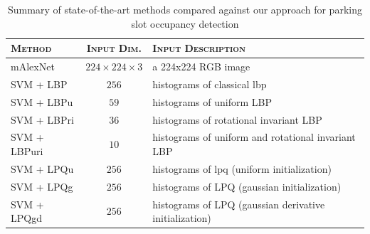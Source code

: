 \begin{table}
    \begin{tabularx}{\linewidth}{lcX}
        \toprule
        \textsc{Method} & \textsc{Input Dim.}     & \textsc{Input Description} \\
        \midrule
        mAlexNet         & $224\times 224\times 3$ & a 224x224 RGB image \\
        SVM + LBP        & $256$                     & histograms of classical \acrfull{lbp} \cite{ojala2002multiresolution} \\
        SVM + LBPu       & $59$                      & histograms of uniform LBP \cite{ojala2002multiresolution} \\
        SVM + LBPri      & $36$                      & histograms of rotational invariant LBP \cite{ojala2002multiresolution}  \\
        SVM + LBPuri     & $10$                      & histograms of uniform and rotational invariant LBP \cite{ojala2002multiresolution} \\
        SVM + LPQu       & $256$                     & histograms of \acrfull{lpq} (uniform initialization) \cite{ojansivu2008blur} \\
        SVM + LPQg       & $256$                     & histograms of LPQ (gaussian initialization) \cite{rahtu2012local} \\
        SVM + LPQgd      & $256$                     & histograms of LPQ (gaussian derivative initialization) \cite{rahtu2012local} \\
        \bottomrule
     \end{tabularx}
     \caption{Summary of state-of-the-art methods compared against our approach for parking slot occupancy detection}
     \label{tab:mini:methods}
\end{table}


